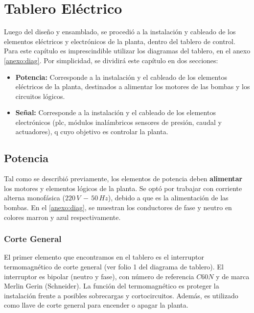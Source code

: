 \chapter{Tablero Eléctrico}
\label{ch:tablero}

Luego del diseño y ensamblado, se procedió a la instalación
y cableado de los elementos eléctricos y electrónicos de la planta, dentro del 
tablero de control. Para este capítulo es imprescindible utilizar los diagramas 
del tablero, en el anexo \ref{anexo:diag}.
Por simplicidad, se dividirá este capítulo en 
dos secciones:
\begin{itemize}
 \item \textbf{Potencia:} Corresponde a la instalación y el cableado
 de los elementos eléctricos de la planta, destinados a alimentar los motores de 
 las bombas y los circuitos lógicos.
 \item \textbf{Señal:} Corresponde a la instalación y el cableado
 de los elementos electrónicos (\gls{plc}, módulos inalámbricos
 sensores de presión, caudal y actuadores), q
 cuyo objetivo es controlar la planta.
\end{itemize}

\section{Potencia}
\label{sec:Potencia}
Tal como se describió previamente, los elementos de potencia deben 
\textbf{alimentar} los motores y elementos lógicos de la planta.
Se optó por trabajar con corriente alterna monofásica ($220\,V\,-\,50\,Hz$), 
debido a que es la alimentación de las bombas. En el \ref{anexo:diag}, se 
muestran los conductores de fase y neutro en colores marron y azul 
respectivamente.

\subsection{Corte General}
El primer elemento que encontramos en el tablero es el interruptor 
termomagnético de corte general (ver folio 1 del diagrama de tablero). El 
interruptor es bipolar (neutro y fase), con número de referencia $C60 N$ y de 
marca Merlin Gerin (Schneider).
La función del termomagnético es proteger la instalación frente a posibles 
sobrecargas y cortocircuitos. Además, es utilizado como llave de corte general 
para encender o apagar la planta.

